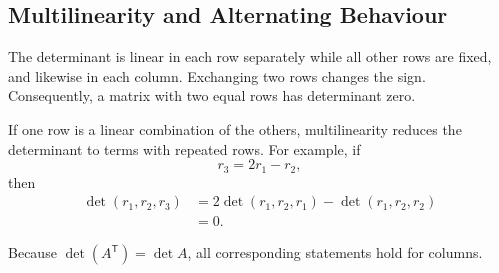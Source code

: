 \subsection{Multilinearity and Alternating Behaviour}

\begin{theorembox}
The determinant is linear in each row separately while all other rows are fixed, and likewise in each column. Exchanging two rows changes the sign. Consequently, a matrix with two equal rows has determinant zero.
\end{theorembox}

If one row is a linear combination of the others, multilinearity reduces the determinant to terms with repeated rows. For example, if
\[
r_3=2r_1-r_2,
\]
then
\begin{align*}
\det(r_1,r_2,r_3)
&=2\det(r_1,r_2,r_1)-\det(r_1,r_2,r_2)\\
&=0.
\end{align*}

Because $\det(A^{\mathsf T})=\det A$, all corresponding statements hold for columns.
